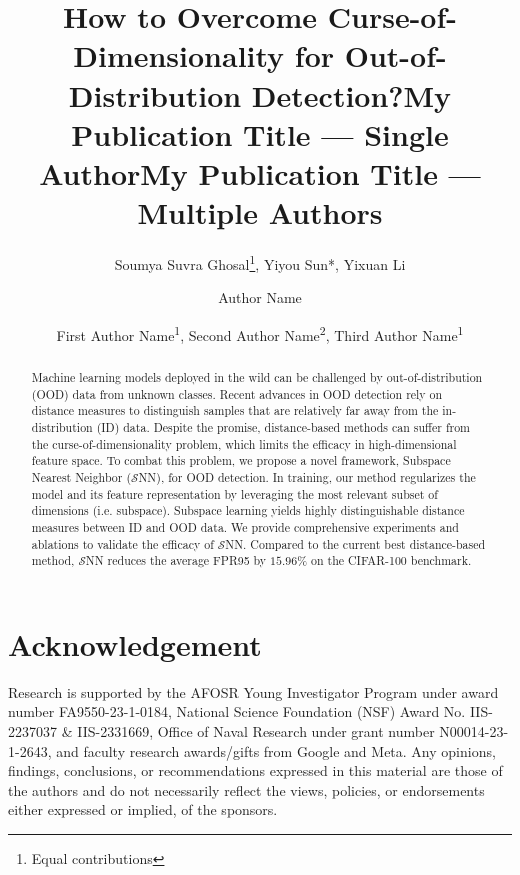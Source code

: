 \documentclass[letterpaper]{article} %
\title{How to Overcome Curse-of-Dimensionality for Out-of-Distribution Detection?}
\author{
    Soumya Suvra Ghosal\footnote{Equal contributions},
    Yiyou Sun*,
    Yixuan Li
}
\title{My Publication Title --- Single Author}
\author {
    Author Name
}
\title{My Publication Title --- Multiple Authors}
\author {
    First Author Name\textsuperscript{\rm 1},
    Second Author Name\textsuperscript{\rm 2},
    Third Author Name\textsuperscript{\rm 1}
}
\def\name{$\mathcal{S}$NN\xspace}
\theoremstyle{plain}
\theoremstyle{definition}
\theoremstyle{remark}
\begin{document}
\maketitle

\begin{abstract}
Machine learning models deployed in the wild can be challenged by out-of-distribution (OOD) data from unknown classes. Recent advances in OOD detection rely on distance measures to distinguish samples that are relatively far away from the in-distribution (ID) data. Despite the promise, distance-based methods can suffer from the curse-of-dimensionality problem, which limits the efficacy in high-dimensional feature space.
To combat this problem, we propose a novel framework, Subspace Nearest Neighbor (\name), for OOD detection. In training, our method regularizes the model and its feature representation by leveraging the most relevant subset of dimensions (i.e. subspace).  Subspace learning yields highly distinguishable distance measures between ID and OOD data.
We provide comprehensive experiments and ablations to validate the efficacy of \name.
Compared to the current best distance-based method, \name reduces the average FPR95 by $15.96\%$ on the CIFAR-100 benchmark.
\end{abstract}









\section*{Acknowledgement}
Research is supported by the AFOSR Young Investigator Program under award number FA9550-23-1-0184, National Science Foundation (NSF) Award No. IIS-2237037 \& IIS-2331669, Office of Naval Research under grant number N00014-23-1-2643, and faculty research awards/gifts from Google and Meta.  Any opinions, findings, conclusions, or recommendations
 expressed in this material are those of the authors and do not necessarily reflect the views, policies, or endorsements either expressed or implied, of the sponsors.
\end{document}
